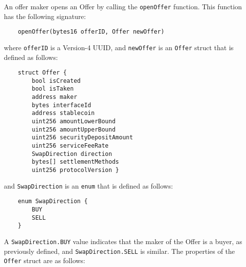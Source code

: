 \documentclass[11pt]{article}
\begin{document}
    An offer maker opens an Offer by calling the \verb|openOffer| function.
    This function has the following signature:
    \begin{verbatim}
    openOffer(bytes16 offerID, Offer newOffer)
    \end{verbatim}
    where \verb|offerID| is a Version-4 UUID\cite{UUID}, and \verb|newOffer| is an \verb|Offer|
    struct that is defined as follows:
    \begin{verbatim}
    struct Offer {
        bool isCreated
        bool isTaken
        address maker
        bytes interfaceId
        address stablecoin
        uint256 amountLowerBound
        uint256 amountUpperBound
        uint256 securityDepositAmount
        uint256 serviceFeeRate
        SwapDirection direction
        bytes[] settlementMethods
        uint256 protocolVersion }
    \end{verbatim}
    and \verb|SwapDirection| is an \verb|enum| that is defined as follows:
    \begin{verbatim}
    enum SwapDirection {
        BUY
        SELL
    }
    \end{verbatim}
    A \verb|SwapDirection.BUY| value indicates that the maker of the Offer is a buyer, as previously
    defined, and \verb|SwapDirection.SELL| is similar.
    The properties of the \verb|Offer| struct are as follows: \\
\end{document}
